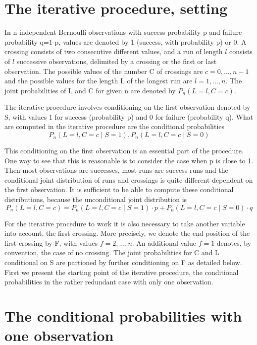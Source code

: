 \section{The iterative procedure, setting}

In n independent Bernoulli observations with success probability p and failure probability q=1-p, values are denoted by 1 (success, with probability p) or 0. A crossing consists of two consecutive different values, and a run of length $l$ consists of $l$ successive observations, delimited by a crossing or the first or last observation. The possible values of the number C of crossings are $c=0, \ldots ,n-1$ and the possible values for the length L of the longest run are $l=1, \ldots ,n$. The joint probabilities of L and C for given n are denoted by $P_n (L=l,C=c)$.

The iterative procedure involves conditioning on the first observation denoted by S, with values 1 for success (probability p) and 0 for failure (probability q). What are computed in the iterative procedure are the conditional probabilities $$P_n (L=l,C=c \mid S=1), P_n (L=l,C=c \mid S=0)$$

This conditioning on the first observation is an essential part of the procedure. One way to see that this is reasonable is to consider the case when p is close to 1. Then most observations are successes, most runs are success runs and the conditional joint distribution of runs and crossings is quite different dependent on the first observation. It is sufficient to be able to compute these conditional distributions, because the unconditional joint distribution is
$$P_n (L=l,C=c) = P_n (L=l,C=c \mid S=1) \cdot p + P_n (L=l,C=c \mid S=0) \cdot q$$

For the iterative procedure to work it is also necessary to take another variable into account, the first crossing. More precisely, we denote the end position of the first crossing by F, with values $f=2, \ldots ,n$. An additional value $f=1$ denotes, by convention, the case of no crossing. The joint probabilities for C and L conditional on S are partioned by further conditioning on F as detailed below. First we present the starting point of the iterative procedure, the conditional probabilities in  the rather redundant case with only one observation.

\section{The conditional probabilities with one observation}

